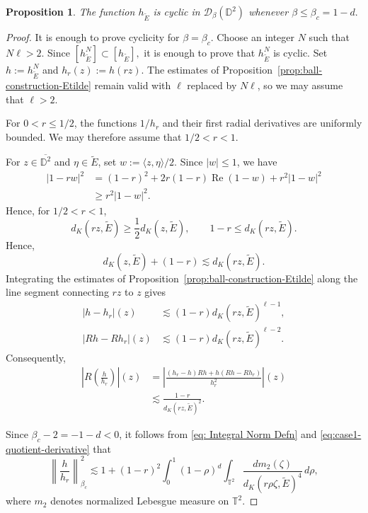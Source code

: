 \documentclass[a4paper,12pt]{amsart}
\newtheorem{prop}[thm]{Proposition}
\theoremstyle{definition}
\begin{document}
\begin{prop}\label{prop:case1-cyclicity}
The function $h_{\widetilde E}$ is cyclic in
$\mathcal D_\beta(\mathbb D^2)$ whenever
$
    \beta\leq\beta_c=1-d.
$
\end{prop}

\begin{proof}
It is enough to prove cyclicity for $\beta=\beta_c$. Choose an integer
$N$ such that $N\ell>2$. Since
$[h_{\widetilde E}^N]\subset[h_{\widetilde E}],$
it is enough to prove that $h_{\widetilde E}^N$ is cyclic. Set
$h:=h_{\widetilde E}^N$ and $h_r(z):=h(rz)$. The estimates of
Proposition~\ref{prop:ball-construction-Etilde} remain valid with
$\ell$ replaced by $N\ell$, so we may assume that $\ell>2$.

For $0<r\leq1/2$, the functions $1/h_r$ and their first radial
derivatives are uniformly bounded. We may therefore assume that
$1/2<r<1$.

For $z\in\overline{\mathbb D^2}$ and $\eta\in\widetilde E$, set
$w:=\langle z,\eta\rangle/2$. Since $|w|\leq1$, we have
\[
\begin{aligned}
    |1-rw|^2
    &=(1-r)^2+2r(1-r)\operatorname{Re}(1-w)
      +r^2|1-w|^2 \\
    &\geq r^2|1-w|^2.
\end{aligned}
\]
Hence, for $1/2<r<1$,
\[
    d_K(rz,\widetilde E)
    \geq\frac12d_K(z,\widetilde E),
    \qquad
    1-r\leq d_K(rz,\widetilde E).
\]
Hence,
\[
    d_K(z,\widetilde E)+(1-r)
    \lesssim d_K(rz,\widetilde E).
\]
Integrating
the estimates of Proposition~\ref{prop:ball-construction-Etilde}
along the line segment connecting $rz$ to $z$ gives
\[
\begin{aligned}
    |h-h_r|(z)
    &\lesssim
    (1-r)d_K(rz,\widetilde E)^{\ell-1},\\
    |Rh-Rh_r|(z)
    &\lesssim
    (1-r)d_K(rz,\widetilde E)^{\ell-2}.
\end{aligned}
\]
Consequently,
\begin{equation}
\begin{aligned}
    \left|R\left(\frac{h}{h_r}\right)\right|(z)
    &=
    \left|
    \frac{(h_r-h)Rh+h(Rh-Rh_r)}{h_r^2}
    \right|(z) \\
    &\lesssim
    \frac{1-r}{d_K(rz,\widetilde E)^2}.
\end{aligned}
\label{eq:case1-quotient-derivative}
\end{equation}

Since $\beta_c-2=-1-d<0$, it follows from
\eqref{eq: Integral Norm Defn} and
\eqref{eq:case1-quotient-derivative} that
\begin{equation}
\left\|\frac{h}{h_r}\right\|_{\beta_c}^2
\lesssim
1+(1-r)^2
\int_0^1(1-\rho)^d
\int_{\mathbb T^2}
\frac{dm_2(\zeta)}
     {d_K(r\rho\zeta,\widetilde E)^4}\,d\rho,
\label{eq:case1-radial-integral}
\end{equation}
where $m_2$ denotes normalized Lebesgue measure on $\mathbb T^2$.


\end{proof}
\end{document}
